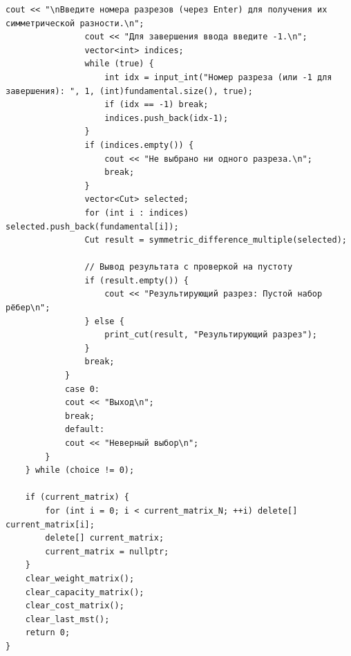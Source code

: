 \begin{lstlisting}[caption=main.cpp]
				cout << "\nВведите номера разрезов (через Enter) для получения их симметрической разности.\n";
				cout << "Для завершения ввода введите -1.\n";
				vector<int> indices;
				while (true) {
					int idx = input_int("Номер разреза (или -1 для завершения): ", 1, (int)fundamental.size(), true);
					if (idx == -1) break;
					indices.push_back(idx-1);
				}
				if (indices.empty()) {
					cout << "Не выбрано ни одного разреза.\n";
					break;
				}
				vector<Cut> selected;
				for (int i : indices) selected.push_back(fundamental[i]);
				Cut result = symmetric_difference_multiple(selected);
				
				// Вывод результата с проверкой на пустоту
				if (result.empty()) {
					cout << "Результирующий разрез: Пустой набор рёбер\n";
				} else {
					print_cut(result, "Результирующий разрез");
				}
				break;
			}
			case 0:
			cout << "Выход\n";
			break;
			default:
			cout << "Неверный выбор\n";
		}
	} while (choice != 0);
	
	if (current_matrix) {
		for (int i = 0; i < current_matrix_N; ++i) delete[] current_matrix[i];
		delete[] current_matrix;
		current_matrix = nullptr;
	}
	clear_weight_matrix();
	clear_capacity_matrix();
	clear_cost_matrix();
	clear_last_mst();
	return 0;
}
\end{lstlisting}